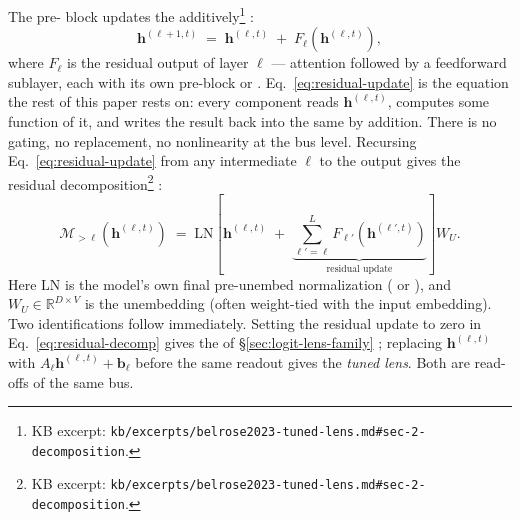 The pre-  block updates the 
additively\footnote{KB excerpt:
\nolinkurl{kb/excerpts/belrose2023-tuned-lens.md#sec-2-decomposition}.}
\citep[\S 2, Eq.~1]{belrose2023-tuned-lens}:
\begin{equation}
  \mathbf{h}^{(\ell+1, t)}
  \;=\;
  \mathbf{h}^{(\ell, t)} \;+\; F_\ell\!\left(\mathbf{h}^{(\ell, t)}\right),
  \label{eq:residual-update}
\end{equation}
where $F_\ell$ is the residual output of layer $\ell$ --- attention
followed by a feedforward sublayer, each with its own pre-block
 or . Eq.~\eqref{eq:residual-update} is the
equation the rest of this paper rests on: every component reads
$\mathbf{h}^{(\ell, t)}$, computes some function of it, and writes the
result back into the same  by addition. There is no
gating, no replacement, no nonlinearity at the bus level. Recursing
Eq.~\eqref{eq:residual-update} from any intermediate $\ell$ to the
output gives the residual decomposition\footnote{KB excerpt:
\nolinkurl{kb/excerpts/belrose2023-tuned-lens.md#sec-2-decomposition}.}
\citep[\S 2, Eq.~2]{belrose2023-tuned-lens}:
\begin{equation}
  \mathcal{M}_{>\ell}\!\left(\mathbf{h}^{(\ell, t)}\right)
  \;=\;
  \mathrm{LN}\!\left[\mathbf{h}^{(\ell, t)}
  \;+\; \underbrace{\sum_{\ell' = \ell}^{L} F_{\ell'}\!\left(\mathbf{h}^{(\ell', t)}\right)}_{\text{residual update}}\right] W_U.
  \label{eq:residual-decomp}
\end{equation}
Here $\mathrm{LN}$ is the model's own final pre-unembed normalization
( or ), and $W_U \in \mathbb{R}^{D \times V}$ is the
unembedding (often weight-tied with the input embedding). Two
identifications follow immediately. Setting the residual update to
zero in Eq.~\eqref{eq:residual-decomp} gives the \emph{}
of \S\ref{sec:logit-lens-family} \citep[\S 2,
Eq.~3]{belrose2023-tuned-lens}; replacing
$\mathbf{h}^{(\ell, t)}$ with $A_\ell\mathbf{h}^{(\ell, t)} +
\mathbf{b}_\ell$ before the same readout gives the \emph{tuned
lens}. Both are read-offs of the same bus.

